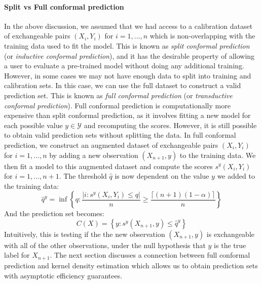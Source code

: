 \documentclass[a4paper, 12pt]{article}
\begin{document}
\paragraph*{Split vs Full conformal prediction} In the above discussion, we assumed that we had access to a calibration dataset of exchangeable pairs $(X_i, Y_i)$ for $i = 1, \ldots, n$ which is non-overlapping with the training data used to fit the model. This is known as \textit{split conformal prediction} (or \textit{inductive conformal prediction}), and it has the desirable property of allowing a user to evaluate a pre-trained model without doing any additional training. However, in some cases we may not have enough data to split into training and calibration sets. In this case, we can use the full dataset to construct a valid prediction set. This is known as \textit{full conformal prediction} (or \textit{transductive conformal prediction}). Full conformal prediction is computationally more expensive than split conformal prediction, as it involves fitting a new model for each possible value $y \in \mathcal{Y}$ and recomputing the scores. However, it is still possible to obtain valid prediction sets without splitting the data. In full conformal prediction, we construct an augmented dataset of exchangeable pairs $(X_i, Y_i)$ for $i = 1, \ldots, n$ by adding a new observation $(X_{n+1}, y)$ to the training data.
We then fit a model to this augmented dataset and compute the scores $s^y(X_i, Y_i)$ for $i = 1, \ldots, n+1$.
The threshold $\hat{q}$ is now dependent on the value $y$ we added to the training data:
\[ \hat{q}^y = \inf \left\{ q: \frac{\left| i : s^y(X_i, Y_i) \leq q \right|}{n} \geq \frac{\lceil (n+1)(1-\alpha) \rceil }{n} \right\} \]
And the prediction set becomes:
\[ C(X) = \left\{ y: s^y(X_{n+1}, y) \leq \hat{q}^y \right\} \]
Intuitively, this is testing if the the new observation $(X_{n+1}, y)$ is exchangeable with all of the other observations, under the null hypothesis that $y$ is the true label for $X_{n+1}$.
The next section discusses a connection between full conformal prediction and kernel density estimation which allows us to obtain prediction sets with asymptotic efficiency guarantees.
\end{document}
